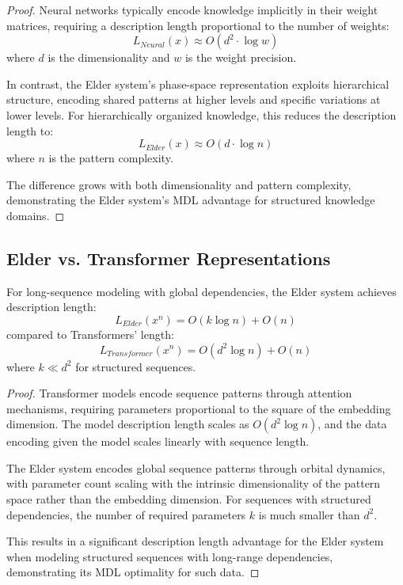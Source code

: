\begin{proof}
Neural networks typically encode knowledge implicitly in their weight matrices, requiring a description length proportional to the number of weights:
\begin{equation}
L_{Neural}(x) \approx O(d^2 \cdot \log w)
\end{equation}
where $d$ is the dimensionality and $w$ is the weight precision.

In contrast, the Elder system's phase-space representation exploits hierarchical structure, encoding shared patterns at higher levels and specific variations at lower levels. For hierarchically organized knowledge, this reduces the description length to:
\begin{equation}
L_{Elder}(x) \approx O(d \cdot \log n)
\end{equation}
where $n$ is the pattern complexity.

The difference grows with both dimensionality and pattern complexity, demonstrating the Elder system's MDL advantage for structured knowledge domains.
\end{proof}

\subsection{Elder vs. Transformer Representations}

\begin{theorem}
For long-sequence modeling with global dependencies, the Elder system achieves description length:
\begin{equation}
L_{Elder}(x^n) = O(k \log n) + O(n)
\end{equation}
compared to Transformers' length:
\begin{equation}
L_{Transformer}(x^n) = O(d^2 \log n) + O(n)
\end{equation}
where $k \ll d^2$ for structured sequences.
\end{theorem}

\begin{proof}
Transformer models encode sequence patterns through attention mechanisms, requiring parameters proportional to the square of the embedding dimension. The model description length scales as $O(d^2 \log n)$, and the data encoding given the model scales linearly with sequence length.

The Elder system encodes global sequence patterns through orbital dynamics, with parameter count scaling with the intrinsic dimensionality of the pattern space rather than the embedding dimension. For sequences with structured dependencies, the number of required parameters $k$ is much smaller than $d^2$.

This results in a significant description length advantage for the Elder system when modeling structured sequences with long-range dependencies, demonstrating its MDL optimality for such data.
\end{proof}

